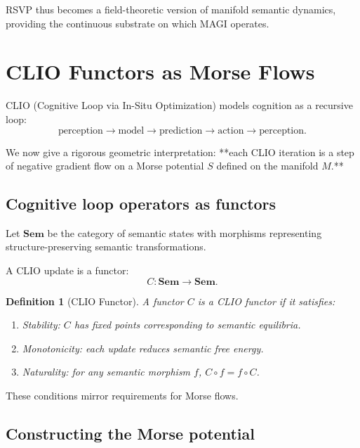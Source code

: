 \documentclass[11pt,a4paper,twocolumn]{article}
\newtheorem{definition}[theorem]{Definition}
\begin{document}
RSVP thus becomes a field-theoretic version of manifold semantic dynamics,
providing the continuous substrate on which MAGI operates.


\section{CLIO Functors as Morse Flows}

CLIO (Cognitive Loop via In-Situ Optimization) models cognition as a
recursive loop:
\[
\text{perception} \to \text{model} \to \text{prediction}
\to \text{action} \to \text{perception}.
\]

We now give a rigorous geometric interpretation:  
**each CLIO iteration is a step of negative gradient flow on a Morse
potential $S$ defined on the manifold $M$.**

\subsection{Cognitive loop operators as functors}

Let $\mathbf{Sem}$ be the category of semantic states with morphisms
representing structure-preserving semantic transformations.

A CLIO update is a functor:
\[
C : \mathbf{Sem} \to \mathbf{Sem}.
\]

\begin{definition}[CLIO Functor]
A functor $C$ is a CLIO functor if it satisfies:
\begin{enumerate}
\item Stability: $C$ has fixed points corresponding to semantic equilibria.
\item Monotonicity: each update reduces semantic free energy.
\item Naturality: for any semantic morphism $f$, $C \circ f = f \circ C$.
\end{enumerate}
\end{definition}

These conditions mirror requirements for Morse flows.

\subsection{Constructing the Morse potential}
\end{document}
